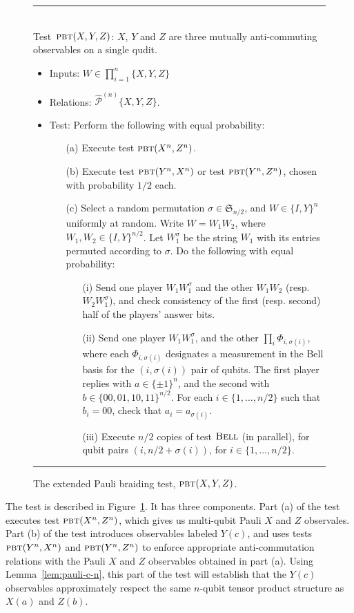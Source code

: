 \documentclass[11pt]{article}
\theoremstyle{remark}
\theoremstyle{definition}
\newcommand{\pbt}{\textsc{pbt}}
\newcommand{\bellt}{\textsc{Bell}}
\newcommand{\epaulin}{\hat{\mathcal{P}}^{(n)}\!}
\begin{document}
\begin{figure}[H]
\rule[1ex]{\textwidth}{0.5pt}\\
Test~$\pbt(X,Y,Z)$: $X$, $Y$ and $Z$ are three mutually anti-commuting observables on a single qudit. 
\begin{itemize}
\item Inputs: $W\in\prod_{i=1}^n\{X,Y,Z\}$
\item Relations: $\epaulin\{X,Y,Z\}$.  
\item Test: Perform the following with equal probability: 
\begin{enumerate}
\item[(a)] Execute test $\pbt(X^n,Z^n)$. 
\item[(b)] Execute test $\pbt(Y^n,X^n)$ or test $\pbt(Y^n,Z^n)$, chosen with probability $1/2$ each.
\item[(c)] Select a random permutation  $\sigma \in \mathfrak{S}_{n/2}$, and $W\in  \{I,Y\}^n$ uniformly at random. Write $W=W_1 W_2$, where $W_1,W_2\in \{I,Y\}^{n/2}$. Let $W_1^\sigma$ be the string $W_1$ with its entries permuted according to $\sigma$. Do the following with equal probability: 
\begin{enumerate}
\item[(i)] Send one player $W_1 W_1^\sigma$ and the other $W_1 W_2$ (resp. $W_2W_1^\sigma$), and check consistency of the first (resp. second) half of the players' answer bits.
\item[(ii)] Send one player $W_1  W_1^\sigma$, and the other $\prod_i \Phi_{i,\sigma(i)}$, where each $\Phi_{i,\sigma(i)}$ designates a measurement in the Bell basis for the $(i,\sigma(i))$ pair of qubits. 
    The first player replies with $a\in\{\pm 1 \}^n$, and the second with $b\in \{00,01,10,11\}^{n/2}$. For each
    $i\in\{1,\ldots,n/2\}$ such that $b_i = 00$, check that $a_i  = a_{\sigma(i)}$. 
\item[(iii)] Execute $n/2$ copies of test $\bellt$ (in parallel), for qubit pairs $(i,n/2+\sigma(i))$, for $i\in\{1,\ldots,n/2\}$. 
\end{enumerate}
\end{enumerate}
\end{itemize}
\rule[2ex]{\textwidth}{0.5pt}\vspace{-1cm}
\caption{The extended Pauli braiding test, $\pbt(X,Y,Z)$.}
\label{fig:e-pbt}
\end{figure}


The test is described in Figure~\ref{fig:e-pbt}. It has three components. Part (a) of the test executes test $\pbt(X^n,Z^n)$, which gives us multi-qubit Pauli $X$ and $Z$ observales. Part (b) of the test introduces observables labeled $Y(c)$, and uses tests $\pbt(Y^n,X^n)$ and $\pbt(Y^n,Z^n)$ to enforce appropriate anti-commutation relations with the Pauli $X$ and $Z$ observables obtained in part (a). Using Lemma~\ref{lem:pauli-c-n}, this part of the test will establish that the $Y(c)$ observables approximately respect the same $n$-qubit tensor product structure as $X(a)$ and $Z(b)$. 
\end{document}
